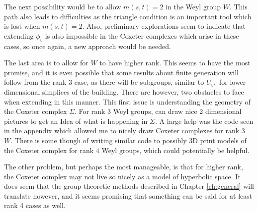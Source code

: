 \documentclass[class=book, crop=false]{standalone}
\begin{document}
The next possibility would be to allow $m(s,t)=2$ in the Weyl group $W.$ This path also leads to difficulties as the triangle condition is an important tool which is lost when $m(s,t)=2.$ Also, preliminary explorations seem to indicate that extending $\phi_v$ is also impossible in the Coxeter complexes which arise in these cases, so once again, a new approach would be needed.

The last area is to allow for $W$ to have higher rank. This seems to have the most promise, and it is even possible that some results about finite generation will follow from the rank 3 case, as there will be subgroups, similar to $U_v,$ for lower dimensional simplices of the building. There are however, two obstacles to face when extending in this manner. This first issue is understanding the geometry of the Coxeter complex $\Sigma.$ For rank 3 Weyl groups, can draw nice 2 dimensional pictures to get an Idea of what is happening in $\Sigma.$ A large help was the code seen in the appendix which allowed me to nicely draw Coxeter complexes for rank 3 $W.$ There is some though of writing similar code to possibly 3D print models of the Coxeter complex for rank 4 Weyl groups, which could potentially be helpful.

The other problem, but perhaps the most manageable, is that for higher rank, the Coxeter complex may not live so nicely as a model of hyperbolic space. It does seem that the group theoretic methods described in Chapter \ref{ch:general} will translate however, and it seems promising that something can be said for at least rank 4 cases as well.
\end{document}

